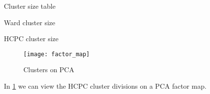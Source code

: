 \begin{table}[h!]
\vspace{5pt}
\caption{Cluster size table}%
\label{tab:cluster_size}
\centering
\begin{subtable}[t]{.3\textwidth}
    \centering
    \caption{Ward cluster size}%
    \label{tab:cluster_size_ward}
    
\end{subtable}
\begin{subtable}[t]{.3\textwidth}
    \centering
    \caption{HCPC cluster size}%
    \label{tab:cluster_size_hcpc}
    
\end{subtable}
\end{table}

\begin{figure}[H]
\centering
\texttt{[image: factor\_map]}
\caption{Clusters on PCA}%
\label{fig:clusters-pca}
\end{figure}

In \cref{fig:clusters-pca} we can view the HCPC cluster divisions on a PCA factor map.

